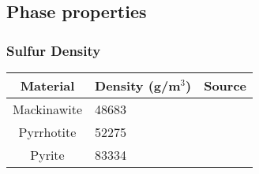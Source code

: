 \documentclass{article}
\begin{document}
\subsection{Phase properties}

\subsubsection{Sulfur Density}

\begin{center}
\begin{tabular}{ | c | l | c |}

\hline
Material & Density (g/m$^3$) & Source \\

\hline
Mackinawite & 48683 & \cite{SATFAL95} \\

\hline
Pyrrhotite & 52275 & \cite{CS6PDV10} \\

\hline
Pyrite & 83334 & \cite{FPPFJM02} \\

\hline
\end{tabular}
\end{center}



\end{document}
